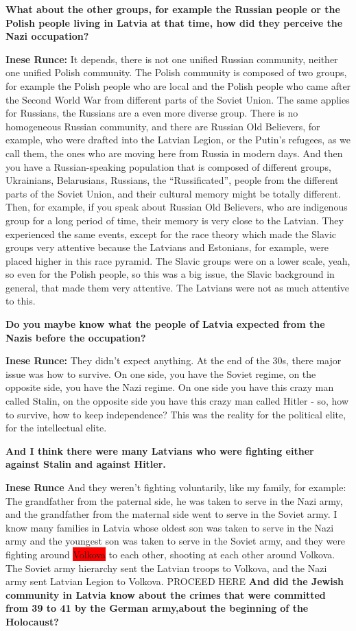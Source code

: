 \textbf{What about the other groups, for example the Russian people or the Polish people living in Latvia at that time, how did they perceive the Nazi occupation?}

\textbf{Inese Runce:} It depends, there is not one unified Russian community, neither one unified Polish community. The Polish community is composed of two groups, for example the Polish people who are local and the Polish people who came after the Second World War from different parts of the Soviet Union. The same applies for Russians, the Russians are a even more diverse group. There is no homogeneous Russian community, and there are Russian Old Believers, for example, who were drafted into the Latvian Legion, or the Putin's refugees, as we call them, the ones who are moving here from Russia in modern days. And then you have a Russian-speaking population that is composed of different groups, Ukrainians, Belarusians, Russians, the ``Russificated'', people from the different parts of the Soviet Union, and their cultural memory might be totally different. Then, for example, if you speak about Russian Old Believers, who are indigenous group for a long period of time, their memory is very close to the Latvian. They experienced the same events, except for the race theory which made the Slavic groups very attentive because the Latvians and Estonians, for example, were placed higher in this race pyramid. The Slavic groups were on a lower scale, yeah, so even for the Polish people, so this was a big issue, the Slavic background in general, that made them very attentive. The Latvians were not as much attentive to this.

\textbf{Do you maybe know what the people of Latvia expected from the Nazis before the occupation?}

\textbf{Inese Runce:} They didn't expect anything. At the end of the 30s, there major issue was how to survive. On one side, you have the Soviet regime, on the opposite side, you have the Nazi regime. On one side you have this crazy man called Stalin, on the opposite side you have this crazy man called Hitler - so, how to survive, how to keep independence?  This was the reality for the political elite, for the intellectual elite. 

\textbf{And I think there were many Latvians who were fighting either against Stalin and against Hitler.} 

\textbf{Inese Runce} And they weren't fighting voluntarily, like my family, for example: The grandfather from the paternal side, he was taken to serve in the Nazi army, and the grandfather from the maternal side went to serve in the Soviet army. I know many families in Latvia whose oldest son was taken to serve in the Nazi army and the youngest son was taken to serve in the Soviet army, and they were fighting around \colorbox{red}{Volkova} to each other, shooting at each other around Volkova. The Soviet army hierarchy sent the Latvian troops to Volkova, and the Nazi army sent Latvian Legion to Volkova.
PROCEED HERE
\textbf{And did the Jewish community in Latvia know about the crimes that were committed from 39 to 41 by the German army,about the beginning of the Holocaust?}

